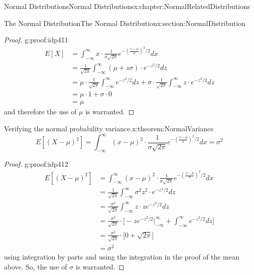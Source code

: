 \documentclass[oneside,10pt,]{book}
\numberwithin{equation}{section}
\begin{document}
\begin{chapterptx}{Normal Distributions}{}{Normal Distributions}{}{}{x:chapter:NormalRelatedDistributions}
\begin{sectionptx}{The Normal Distribution}{}{The Normal Distribution}{}{}{x:section:NormalDistribution}
\begin{proof}{}{g:proof:idp411}
\begin{align*}
E[X] &= \int_{-\infty}^{\infty} x \cdot \frac{1}{\sigma \sqrt{2 \pi}} e^{ - \left ( \frac{x-\mu}{\sigma} \right ) ^2 / 2} dx \\
&= \frac{1}{\sqrt{2 \pi}} \int_{-\infty}^{\infty} (\mu + z\sigma) \cdot e^{ -z^2 / 2} dz\\
&= \mu \cdot \frac{1}{\sqrt{2 \pi}} \int_{-\infty}^{\infty} e^{ -z^2 / 2} dz + \sigma \cdot \frac{1}{\sqrt{2 \pi}} \int_{-\infty}^{\infty} z \cdot e^{ -z^2 / 2} dz\\
&= \mu \cdot 1 + \sigma \cdot 0\\
& = \mu
\end{align*}
and therefore the use of \(\mu\) is warranted.%
\end{proof}
%
\par
\begin{theorem}{Verifying the normal probability variance.}{}{x:theorem:NormalVariance}%
%
\begin{equation*}
E[(X-\mu)^2] = \int_{-\infty}^{\infty} (x-\mu)^2 \cdot \frac{1}{\sigma \sqrt{2 \pi}} e^{ - \left ( \frac{x-\mu}{\sigma} \right ) ^2 / 2} dx = \sigma^2
\end{equation*}
%
\end{theorem}
\begin{proof}{}{g:proof:idp412}
%
\begin{align*}
E[(X-\mu)^2] & = \int_{-\infty}^{\infty} (x-\mu)^2 \cdot \frac{1}{\sigma \sqrt{2 \pi}} e^{ - \left ( \frac{x-\mu}{\sigma} \right ) ^2 / 2} dx\\
& = \frac{1}{\sqrt{2 \pi}} \int_{-\infty}^{\infty} \sigma^2 z^2 \cdot  e^{ -z^2 / 2} dz\\
& = \frac{\sigma^2}{\sqrt{2 \pi}} \int_{-\infty}^{\infty} z \cdot z e^{ -z^2 / 2} dz\\
& = \frac{\sigma^2}{\sqrt{2 \pi}} \cdot \big [ -z e^{-z^2 / 2} \big |_{-\infty}^{\infty} + \int_{-\infty}^{\infty}  e^{ -z^2 / 2}  dz \big ]\\
& = \frac{\sigma^2}{\sqrt{2 \pi}} \cdot \big [ 0 + \sqrt{2 \pi} \big ]\\
& = \sigma^2 
\end{align*}
using integration by parts and using the integration in the proof of the mean above.  So, the use of \(\sigma\) is warranted.%
\end{proof}
%
\par

\end{sectionptx}
\end{chapterptx}
\end{document}
